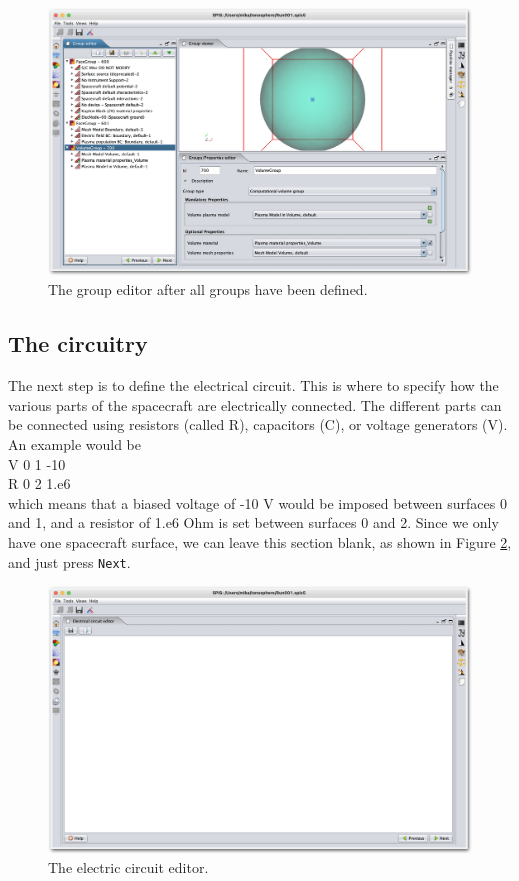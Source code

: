 \documentclass[a4paper, 12pt]{article}
\begin{document}
\begin{figure}[!ht]
    \centering
    \includegraphics[width=1\textwidth]{fig15.jpg}
    \caption{The group editor after all groups have been defined.}
    \label{15}
\end{figure}

\subsection{The circuitry}
\vspace{2mm}

The next step is to define the electrical circuit. This is where to specify how the various parts of the spacecraft are electrically connected. The different parts can be connected using resistors (called R), capacitors (C), or voltage generators (V). An example would be\\

V  0  1  -10\\
R  0  2  1.e6\\

which means that a biased voltage of -10 V would be imposed between surfaces 0 and 1, and a resistor of 1.e6 Ohm is set between surfaces 0 and 2. Since we only have one spacecraft surface, we can leave this section blank, as shown in Figure \ref{16}, and just press \verb|Next|. \\

\begin{figure}[!ht]
    \centering
    \includegraphics[width=1\textwidth]{fig16.jpg}
    \caption{The electric circuit editor.}
    \label{16}
\end{figure}
\end{document}
